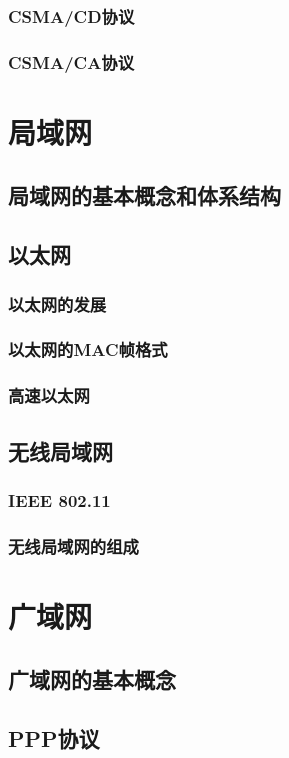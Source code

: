 \documentclass[lang=cn,newtx,10pt,scheme=chinese]{../../elegantbook}
\begin{document}
\subsubsection{CSMA/CD协议}
\subsubsection{CSMA/CA协议}

\section{局域网}
\subsection{局域网的基本概念和体系结构}
\subsection{以太网}
\subsubsection{以太网的发展}
\subsubsection{以太网的MAC帧格式}
\subsubsection{高速以太网}
\subsection{无线局域网}
\subsubsection{IEEE 802.11}
\subsubsection{无线局域网的组成}

\section{广域网}
\subsection{广域网的基本概念}
\subsection{PPP协议}
\end{document}
